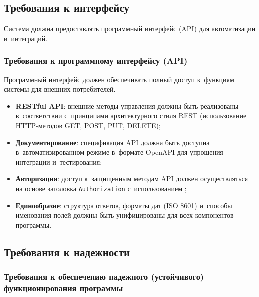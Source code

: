 \documentclass[12pt,a4paper]{extarticle}
\begin{document}
\subsection{Требования к интерфейсу}
\label{sec:interface_reqs}

\begin{hseExample}
Система должна предоставлять программный интерфейс (API) для автоматизации и~интеграций.
\end{hseExample}

\subsubsection{Требования к программному интерфейсу (API)}

\begin{hseExample}
Программный интерфейс должен обеспечивать полный доступ к~функциям системы для внешних потребителей.
\begin{itemize}[nosep, leftmargin=1.25cm]
    \item \textbf{RESTful API}: внешние методы управления должны быть реализованы в~соответствии с~принципами архитектурного стиля REST (использование HTTP-методов GET, POST, PUT, DELETE);
    \item \textbf{Документирование}: спецификация API должна быть доступна в~автоматизированном режиме в~формате OpenAPI для упрощения интеграции и~тестирования;
    \item \textbf{Авторизация}: доступ к~защищенным методам API должен осуществляться на основе заголовка \texttt{Authorization} с~использованием ;
    \item \textbf{Единообразие}: структура ответов, форматы дат (ISO 8601) и~способы именования полей должны быть унифицированы для всех компонентов программы.
\end{itemize}
\end{hseExample}

\subsection{Требования к надежности}

\subsubsection{Требования к обеспечению надежного (устойчивого) функционирования программы}
\end{document}
